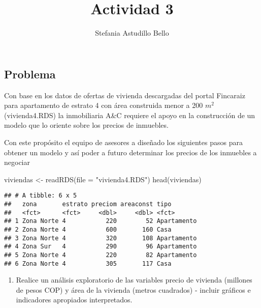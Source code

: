 \documentclass[
]{article}
\title{Actividad 3}
\author{Stefania Astudillo Bello}
\date{}
\newenvironment{Shaded}{\begin{snugshade}}{\end{snugshade}}
\newcommand{\AttributeTok}[1]{\textcolor[rgb]{0.77,0.63,0.00}{#1}}
\newcommand{\FunctionTok}[1]{\textcolor[rgb]{0.00,0.00,0.00}{#1}}
\newcommand{\NormalTok}[1]{#1}
\newcommand{\OtherTok}[1]{\textcolor[rgb]{0.56,0.35,0.01}{#1}}
\newcommand{\StringTok}[1]{\textcolor[rgb]{0.31,0.60,0.02}{#1}}
\providecommand{\tightlist}{%
  \setlength{\itemsep}{0pt}\setlength{\parskip}{0pt}}
\begin{document}
\maketitle

\hypertarget{problema}{%
\subsection{Problema}\label{problema}}

Con base en los datos de ofertas de vivienda descargadas del portal
Fincaraiz para apartamento de estrato 4 con área construida menor a 200
\(m^2\) (vivienda4.RDS) la inmobiliaria A\&C requiere el apoyo en la
construcción de un modelo que lo oriente sobre los precios de inmuebles.

Con este propósito el equipo de asesores a diseñado los siguientes pasos
para obtener un modelo y así poder a futuro determinar los precios de
los inmuebles a negociar

\begin{Shaded}
\begin{Highlighting}[]
\NormalTok{viviendas }\OtherTok{\textless{}{-}} \FunctionTok{readRDS}\NormalTok{(}\AttributeTok{file =} \StringTok{"vivienda4.RDS"}\NormalTok{)}
\FunctionTok{head}\NormalTok{(viviendas)}
\end{Highlighting}
\end{Shaded}

\begin{verbatim}
## # A tibble: 6 x 5
##   zona       estrato preciom areaconst tipo       
##   <fct>      <fct>     <dbl>     <dbl> <fct>      
## 1 Zona Norte 4           220        52 Apartamento
## 2 Zona Norte 4           600       160 Casa       
## 3 Zona Norte 4           320       108 Apartamento
## 4 Zona Sur   4           290        96 Apartamento
## 5 Zona Norte 4           220        82 Apartamento
## 6 Zona Norte 4           305       117 Casa
\end{verbatim}

\begin{enumerate}
\def\labelenumi{\arabic{enumi}.}
\tightlist
\item
  Realice un análisis exploratorio de las variables precio de vivienda
  (millones de pesos COP) y área de la vivienda (metros cuadrados) -
  incluir gráficos e indicadores apropiados interpretados.
\end{enumerate}
\end{document}
